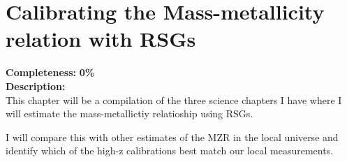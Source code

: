 \chapter{Calibrating the Mass-metallicity relation with RSGs}
\label{ch:mzr}

\textbf{Completeness:} \textbf{0\%} \\


\textbf{Description:} \\
This chapter will be a compilation of the three science chapters I have
where I will estimate the mass-metallictiy relatioship using RSGs.

I will compare this with other estimates of the MZR in the local universe and
identify which of the high-z calibrations best match our local measurements.

